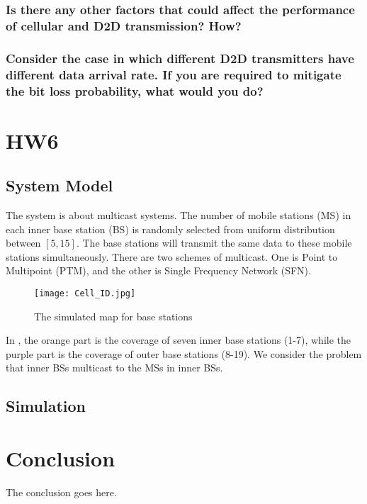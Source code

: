 \documentclass[conference]{IEEEtran}
\begin{document}
\subsubsection{Is there any other factors that could affect the performance of cellular and D2D transmission? How?}

\subsubsection{Consider the case in which different D2D transmitters have different data arrival rate. If you are required to mitigate the bit loss probability, what would you do?}

\section{HW6}

\subsection{System Model}
The system is about multicast systems. The number of mobile stations (MS) in each inner base station (BS) is randomly selected from uniform distribution between $[5, 15]$. The base stations will transmit the same data to these mobile stations simultaneously. There are two schemes of multicast. One is Point to Multipoint (PTM), and the other is Single Frequency Network (SFN).
\begin{figure}[htbp]
    \centering
    \texttt{[image: Cell\_ID.jpg]}
    \caption{The simulated map for base stations}
    \label{fig:bs_map}
\end{figure}
In , the orange part is the coverage of seven inner base stations (1-7), while the purple part is the coverage of outer base stations (8-19). We consider the problem that inner BSs multicast to the MSs in inner BSs.
\subsection{Simulation}

\section{Conclusion}
The conclusion goes here.
\end{document}
